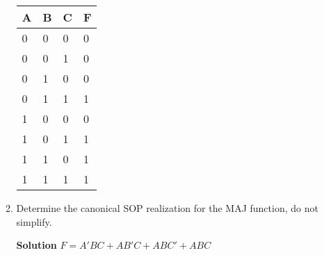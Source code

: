 \begin{enumerate}
\begin{enumerate}
\begin{onlysolution}
                                    \begin{tabular}{l|l|l||l}
                                        A & B & C &  F \\ \hline \rowcolor{gray!15}
                                        0 & 0 & 0 &  0 \\ \hline
                                        0 & 0 & 1 &  0 \\ \hline \rowcolor{gray!15}
                                        0 & 1 & 0 &  0 \\ \hline
                                        0 & 1 & 1 &  1 \\ \hline \rowcolor{gray!15}
                                        1 & 0 & 0 &  0 \\ \hline
                                        1 & 0 & 1 &  1 \\ \hline \rowcolor{gray!15}
                                        1 & 1 & 0 &  1 \\ \hline
                                        1 & 1 & 1 &  1 \\
                                    \end{tabular}
                                \end{onlysolution}

                            \item Determine the canonical SOP realization for the MAJ
                                function, do not simplify.

                                \begin{onlysolution}  \textbf{Solution}
                                    $F = A'BC + AB'C+ABC'+ABC$
                                \end{onlysolution}
                        \end{enumerate}


\end{enumerate}

